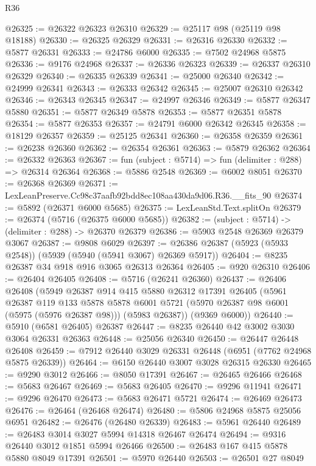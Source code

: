 \begin{lexlean}{R36}
\begin{coremodule}
@26325 := @26322 @26323 @26310
@26329 := @25117 @98 (@25119 @98 @18188)
@26330 := @26325 @26329
@26331 := @26316 @26330
@26332 := @5877 @26331
@26333 := @24786 @6000
@26335 := @7502 @24968 @5875
@26336 := @9176 @24968
@26337 := @26336 @26323
@26339 := @26337 @26310 @26329
@26340 := @26335 @26339
@26341 := @25000 @26340
@26342 := @24999 @26341
@26343 := @26333 @26342
@26345 := @25007 @26310 @26342
@26346 := @26343 @26345
@26347 := @24997 @26346
@26349 := @5877 @26347 @5880
@26351 := @5877 @26349 @5878
@26353 := @5877 @26351 @5878
@26354 := @5877 @26353
@26357 := @24791 @6000 @26342 @26345
@26358 := @18129 @26357
@26359 := @25125 @26341
@26360 := @26358 @26359
@26361 := @26238 @26360
@26362 := @26354 @26361
@26363 := @5879 @26362
@26364 := @26332 @26363
@26367 := fun (subject : @5714) => fun (delimiter : @288) => @26314 @26364
@26368 := @5886 @2548
@26369 := @6002 @8051
@26370 := @26368 @26369
@26371 := LexLeanPreserve.Cc98c37aafb92bdd8ec108aa430da9d06.R36.__fits_90
@26374 := @5892 (@26371 @6000 @5685)
@26375 := LexLeanStd.Text.splitOn
@26379 := @26374 (@5716 (@26375 @6000 @5685))
@26382 := (subject : @5714) -> (delimiter : @288) -> @26370 @26379
@26386 := @5903 @2548 @26369 @26379 @3067
@26387 := @9808 @6029
@26397 := @26386 @26387 (@5923 (@5933 @2548)) (@5939 (@5940 (@5941 @3067) @26369 @5917))
@26404 := @8235 @26387 @34 @918 @916 @3065 @26313 @26364
@26405 := @920 @26310
@26406 := @26404 @26405
@26408 := @5716 (@26241 @26360)
@26437 := @26406
    @26408
    (@5949
      @26387
      @914
      @415
      @5880
      @26312
      @17391
      @26405
      (@5961
        @26387
        @119
        @133
        @5878
        @5878
        @6001
        @5721
        (@5970 @26387 @98 @6001 (@5975 (@5976 @26387 @98)))
        (@5983 @26387))
      (@9369 @6000))
@26440 := @5910 (@6581 @26405) @26387
@26447 := @8235 @26440 @42 @3002 @3030 @3064 @26331 @26363
@26448 := @25056 @26340
@26450 := @26447 @26448 @26408
@26459 := @7912 @26440 @3029 @26331 @26448 (@6951 (@7762 @24968 @5875 @26339))
@26464 := @6150 @26440 @3007 @3028 @26315 @26330
@26465 := @9290 @3012
@26466 := @8050 @17391
@26467 := @26465 @26466
@26468 := @5683 @26467
@26469 := @5683 @26405
@26470 := @9296 @11941
@26471 := @9296 @26470
@26473 := @5683 @26471 @5721
@26474 := @26469 @26473
@26476 := @26464 (@26468 @26474)
@26480 := @5806 @24968 @5875 @25056 @6951
@26482 := @26476 (@26480 @26339)
@26483 := @5961 @26440
@26489 := @26483 @3014 @3027 @5994 @14318 @26467 @26474
@26494 := @9316 @26440 @3012 @1851 @5994 @26466
@26500 := @26483 @167 @415 @5878 @5880 @8049 @17391
@26501 := @5970 @26440
@26503 := @26501 @27 @8049

\end{coremodule}
\end{lexlean}
